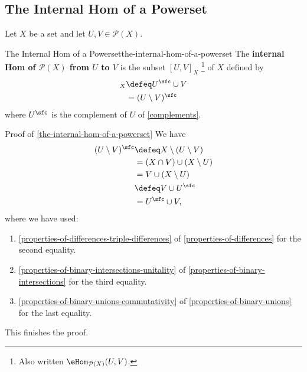 \subsection{The Internal Hom of a Powerset}\label{subsection-the-internal-hom-of-a-powerset}
Let $X$ be a set and let $U,V\in\mathcal{P}(X)$.
\begin{definition}{The Internal Hom of a Powerset}{the-internal-hom-of-a-powerset}%
    The \textbf{internal Hom of $\mathcal{P}(X)$ from $U$ to $V$} is the subset $[U,V]_{X}$%
    \footnote{%
        Also written $\eHom_{\mathcal{P}(X)}(U,V)$.
        \par\vspace*{\TCBBoxCorrection}
    } %
    of $X$ defined by
    \begin{align*}
        [U,V]_{X} &\defeq U^{\sfc}\cup V\\%
                  &=      (U\setminus V)^{\sfc}%
    \end{align*}
    where $U^{\sfc}$ is the complement of $U$ of \cref{complements}.
\end{definition}
\begin{Proof}{Proof of \cref{the-internal-hom-of-a-powerset}}%
    We have
    \begin{align*}
        (U\setminus V)^{\sfc} &\defeq X\setminus(U\setminus V)\\%
                              &=      (X\cap V)\cup(X\setminus U)\\%
                              &=      V\cup(X\setminus U)\\%
                              &\defeq V\cup U^{\sfc}\\%
                              &=      U^{\sfc}\cup V,%
    \end{align*}
    where we have used:
    \begin{enumerate}
        \item\label{proof-of-the-internal-hom-of-a-powerset-1}\cref{properties-of-differences-triple-differences} of \cref{properties-of-differences} for the second equality.
        \item\label{proof-of-the-internal-hom-of-a-powerset-2}\cref{properties-of-binary-intersections-unitality} of \cref{properties-of-binary-intersections} for the third equality.
        \item\label{proof-of-the-internal-hom-of-a-powerset-3}\cref{properties-of-binary-unions-commutativity} of \cref{properties-of-binary-unions} for the last equality.
    \end{enumerate}
    This finishes the proof.
\end{Proof}
